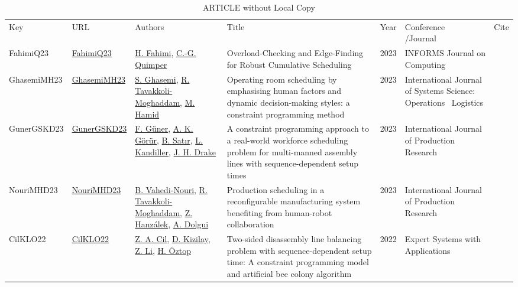 {\scriptsize
\begin{longtable}{p{2cm}p{2cm}p{5cm}p{10cm}rp{3cm}l}
\rowcolor{white}\caption{ARTICLE without Local Copy}\\ \toprule
\rowcolor{white}Key & URL & Authors & Title & Year & \shortstack{Conference\\/Journal} & Cite\\ \midrule
\endhead
\bottomrule
\endfoot
FahimiQ23 & \href{http://dx.doi.org/10.1287/ijoc.2021.0138}{FahimiQ23} & \hyperref[auth:a122]{H. Fahimi}, \hyperref[auth:a37]{C.-G. Quimper} & Overload-Checking and Edge-Finding for Robust Cumulative Scheduling & 2023 & \cellcolor{red!20}INFORMS Journal on Computing & \cite{FahimiQ23}\\
GhasemiMH23 & \href{http://dx.doi.org/10.1080/23302674.2023.2224509}{GhasemiMH23} & \hyperref[auth:a982]{S. Ghasemi}, \hyperref[auth:a430]{R. Tavakkoli-Moghaddam}, \hyperref[auth:a983]{M. Hamid} & Operating room scheduling by emphasising human factors and dynamic decision-making styles: a constraint programming method & 2023 & \cellcolor{red!20}International Journal of Systems Science: Operations \  Logistics & \cite{GhasemiMH23}\\
GunerGSKD23 & \href{http://dx.doi.org/10.1080/00207543.2023.2226772}{GunerGSKD23} & \hyperref[auth:a1427]{F. G\"{u}ner}, \hyperref[auth:a1428]{A. K. G\"{o}r\"{u}r}, \hyperref[auth:a1429]{B. Satır}, \hyperref[auth:a1430]{L. Kandiller}, \hyperref[auth:a1431]{J. H. Drake} & A constraint programming approach to a real-world workforce scheduling problem for multi-manned assembly lines with sequence-dependent setup times & 2023 & \cellcolor{red!20}International Journal of Production Research & \cite{GunerGSKD23}\\
NouriMHD23 & \href{http://dx.doi.org/10.1080/00207543.2023.2173503}{NouriMHD23} & \hyperref[auth:a737]{B. Vahedi-Nouri}, \hyperref[auth:a430]{R. Tavakkoli-Moghaddam}, \hyperref[auth:a947]{Z. Hanzálek}, \hyperref[auth:a948]{A. Dolgui} & Production scheduling in a reconfigurable manufacturing system benefiting from human-robot collaboration & 2023 & \cellcolor{red!20}International Journal of Production Research & \cite{NouriMHD23}\\
CilKLO22 & \href{http://dx.doi.org/10.1016/j.eswa.2022.117529}{CilKLO22} & \hyperref[auth:a1382]{Z. A. Cil}, \hyperref[auth:a1381]{D. Kizilay}, \hyperref[auth:a1383]{Z. Li}, \hyperref[auth:a1384]{H. \"{O}ztop} & Two-sided disassembly line balancing problem with sequence-dependent setup time: A constraint programming model and artificial bee colony algorithm & 2022 & Expert Systems with Applications & \cite{CilKLO22}\\

\end{longtable}}

